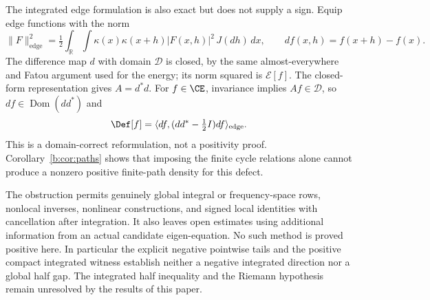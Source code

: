 \documentclass[11pt,a4paper]{article}
\numberwithin{equation}{section}
\theoremstyle{definition}\newtheorem{definition}[theorem]{Definition}
\theoremstyle{remark}\newtheorem{remark}[theorem]{Remark}
\newcommand{\R}{\mathbb R}\newcommand{\C}{\mathbb C}\newcommand{\N}{\mathbb N}
\newcommand{\E}{\mathcal E}\newcommand{\D}{\mathcal D}
\newcommand{\dom}{\operatorname{Dom}}\newcommand{\Var}{\operatorname{Var}}
\newcommand{\ip}[2]{\langle#1,#2\rangle}\newcommand{\norm}[1]{\lVert#1\rVert}\newcommand{\abs}[1]{\lvert#1\rvert}
\begin{document}
The integrated edge formulation is also exact but does not supply a sign. Equip edge functions with the norm
\[
 \norm F_{\mathrm{edge}}^2=\tfrac12\int_\R\int
     \kappa(x)\kappa(x+h)|F(x,h)|^2\,J(dh)\,dx,
 \qquad df(x,h)=f(x+h)-f(x).
\]
The difference map $d$ with domain $\D$ is closed, by the same almost-everywhere and Fatou argument used for the energy; its norm squared is $\E[f]$. The closed-form representation gives $A=d^*d$. For $f\in\CE$, invariance implies $Af\in\D$, so $df\in\dom(dd^*)$ and
\begin{equation}\label{b:eq:edge-defect}
 \Def[f]=\ip{df}{(dd^*-\tfrac12I)df}_{\mathrm{edge}}.
\end{equation}
This is a domain-correct reformulation, not a positivity proof. Corollary~\ref{b:cor:paths} shows that imposing the finite cycle relations alone cannot produce a nonzero positive finite-path density for this defect.

The obstruction permits genuinely global integral or frequency-space rows, nonlocal inverses, nonlinear constructions, and signed local identities with cancellation after integration. It also leaves open estimates using additional information from an actual candidate eigen-equation. No such method is proved positive here. In particular the explicit negative pointwise tails and the positive compact integrated witness establish neither a negative integrated direction nor a global half gap. The integrated half inequality and the Riemann hypothesis remain unresolved by the results of this paper.
\end{document}

